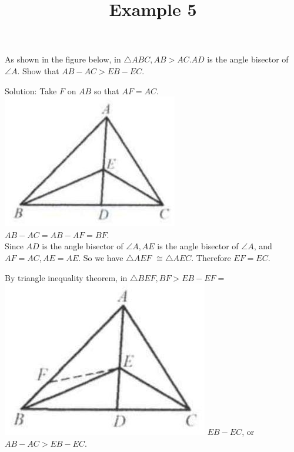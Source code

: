 \documentclass{article}
\title{Example 5}
\date{}
\begin{document}
\maketitle

As shown in the figure below, in \(\triangle A B C, A B>A C . A D\) is the angle bisector of \(\angle A\). Show that \(A B-A C>E B-E C\).

Solution:
Take \(F\) on \(A B\) so that \(A F=A C\).\\
\centering
\includegraphics[width=\textwidth]{images/problem_image_1.jpg}\\
\(A B-A C=A B-A F=B F\).\\
Since \(A D\) is the angle bisector of \(\angle A, A E\) is the angle bisector of \(\angle A\), and \(A F=A C, A E=A E\). So we have \(\triangle A E F\) \(\cong \triangle A E C\). Therefore \(E F=E C\).

By triangle inequality theorem, in \(\triangle B E F, B F>E B-E F=\)\\
\includegraphics[width=\textwidth]{images/reasoning_image_1.jpg} \(E B-E C\), or \(A B-A C>E B-E C\).
\end{document}
